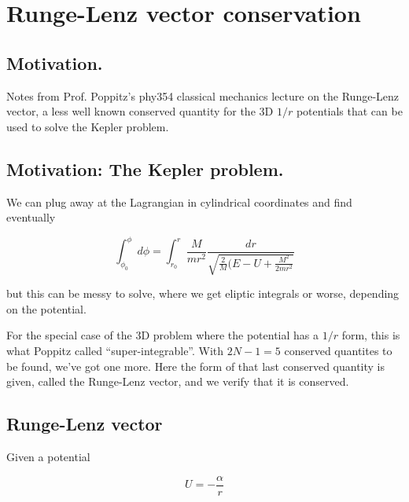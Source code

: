 
%

\chapter{Runge-Lenz vector conservation}
\label{chap:RungeLenz}
{}
\date{Feb 11, 2012}

\beginArtWithToc

\section{Motivation.}

Notes from Prof. Poppitz's phy354 classical mechanics lecture on the Runge-Lenz vector, a less well known conserved quantity for the 3D $1/r$ potentials that can be used to solve the Kepler problem.

\section{Motivation: The Kepler problem.}

We can plug away at the Lagrangian in cylindrical coordinates and find eventually

\begin{equation}\label{eqn:RungeLenz:n}
\int_{\phi_0}^\phi d\phi = \int_{r_0}^r \frac{M}{m r^2} \frac{dr}{\sqrt{\frac{2}{M} ( E - U + \frac{M^2}{2 m r^2}}}
\end{equation}

but this can be messy to solve, where we get eliptic integrals or worse, depending on the potential.

For the special case of the 3D problem where the potential has a $1/r$ form, this is what Poppitz called ``super-integrable''.  With $2N - 1 = 5$ conserved quantites to be found, we've got one more.  Here the form of that last conserved quantity is given, called the Runge-Lenz vector, and we verify that it is conserved.

\section{Runge-Lenz vector}

Given a potential

\begin{equation}\label{eqn:RungeLenz:n}
U = -\frac{\alpha}{r}
\end{equation}

